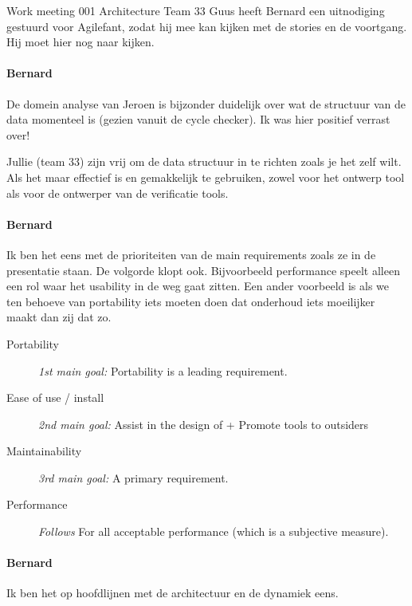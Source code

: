 \documentclass[a4paper,final]{article}
\begin{document}
\begin{Minutes}{Work meeting 001 Architecture Team 33}
Guus heeft Bernard een uitnodiging gestuurd voor Agilefant, zodat hij mee kan
kijken met de stories en de voortgang. Hij moet hier nog naar kijken.


\paragraph{Bernard} De domein analyse van Jeroen is bijzonder duidelijk over
wat de structuur van de data momenteel is (gezien vanuit de cycle checker).  Ik
was hier positief verrast over! 

Jullie (team 33) zijn vrij om de data structuur in te richten zoals je het zelf wilt.
Als het maar effectief is en gemakkelijk te gebruiken, zowel voor het ontwerp tool
als voor de ontwerper van de verificatie tools.


\paragraph{Bernard} Ik ben het eens met de prioriteiten van de main
requirements zoals ze in de presentatie staan. De volgorde klopt
ook.  Bijvoorbeeld performance speelt alleen een rol waar het usability in de
weg gaat zitten.  Een ander voorbeeld is als we ten behoeve van portability
iets moeten doen dat onderhoud iets moeilijker maakt dan zij dat zo.

\begin{description}

	\item[Portability] {\color{blue} \it 1st main goal:} Portability is a
		leading requirement.

	\item[Ease of use / install] {\color{blue} \it 2nd main goal:} Assist in
		the design of \Noc + Promote tools to outsiders

	\item[Maintainability] {\color{blue} \it 3rd main goal:} A primary
		requirement.

	\item[Performance] {\color{blue} \it Follows} For all acceptable
		performance (which is a subjective measure). 

\end{description}


\paragraph{Bernard} Ik ben het op hoofdlijnen met de architectuur en de dynamiek eens.


\end{Minutes}
\end{document}
